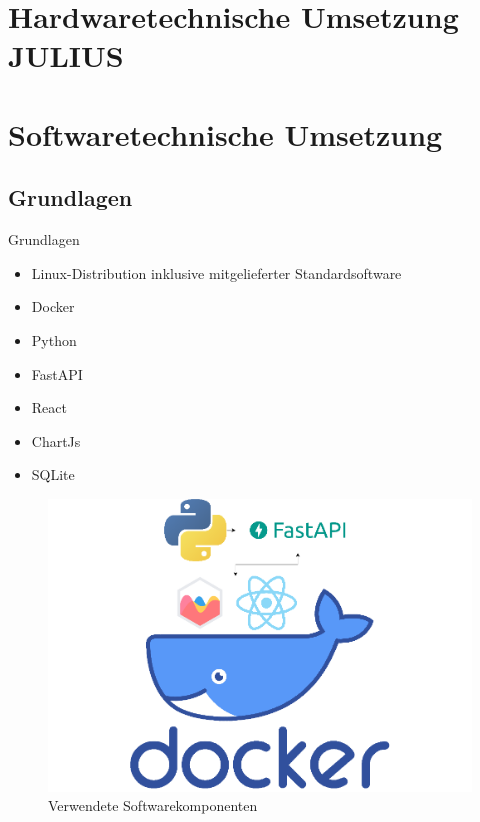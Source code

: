 \documentclass[10pt,ngerman]{beamer}
\begin{document}
\section{Hardwaretechnische Umsetzung JULIUS}

\section{Softwaretechnische Umsetzung}

\subsection{Grundlagen}
\begin{frame}[fragile]{Grundlagen}
    \begin{minipage}[t]{0.49\textwidth}
      \begin{itemize}
        \item Linux-Distribution inklusive mitgelieferter Standardsoftware
        \item Docker
        \item Python
        \item FastAPI
        \item React
        \item ChartJs
        \item SQLite
      \end{itemize}
    \end{minipage}
    \begin{minipage}[t]{0.49\textwidth}
      \begin{figure}
        \centering
        \captionsetup{justification=centering}
        \includegraphics[width=1\textwidth]{pictures/SoftwareKomponenten.png}
        \caption{Verwendete Softwarekomponenten}
      \end{figure}
    \end{minipage}
\end{frame}
\end{document}
